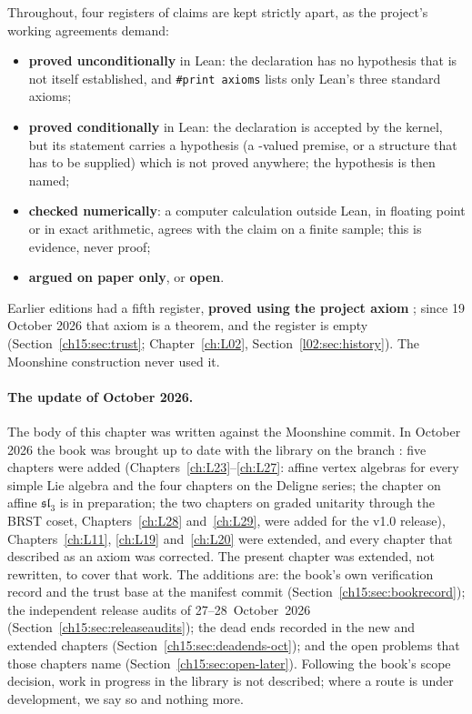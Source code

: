 Throughout, four registers of claims are kept strictly apart, as the project's working agreements
demand:
\begin{itemize}
\item \textbf{proved unconditionally} in Lean: the declaration has no hypothesis that is not
  itself established, and \texttt{\#print axioms} lists only Lean's three standard axioms;
\item \textbf{proved conditionally} in Lean: the declaration is accepted by the kernel, but its
  statement carries a hypothesis (a -valued premise, or a structure that has to be
  supplied) which is not proved anywhere; the hypothesis is then named;
\item \textbf{checked numerically}: a computer calculation outside Lean, in floating point or in
  exact arithmetic, agrees with the claim on a finite sample; this is evidence, never proof;
\item \textbf{argued on paper only}, or \textbf{open}.
\end{itemize}
Earlier editions had a fifth register, \textbf{proved using the project axiom}
; since 19 October 2026 that axiom is a theorem, and the register is empty
(Section~\ref{ch15:sec:trust}; Chapter~\ref{ch:L02}, Section~\ref{l02:sec:history}).
The Moonshine construction never used it.

\paragraph{The update of October 2026.} The body of this chapter was written against the Moonshine commit. In October 2026
the book was brought up to date with the library on the branch : five chapters were added
(Chapters~\ref{ch:L23}--\ref{ch:L27}: affine vertex algebras for every simple Lie algebra and the four chapters on the
Deligne series; the chapter on affine $\mathfrak{sl}_3$ is in preparation; the two chapters on graded unitarity through the
BRST coset, Chapters~\ref{ch:L28} and~\ref{ch:L29}, were added for the v1.0 release), Chapters~\ref{ch:L11}, \ref{ch:L19}
and~\ref{ch:L20} were extended, and every chapter that described  as an axiom was corrected. The present
chapter was extended, not rewritten, to cover that work. The additions are: the book's own verification record and the
trust base at the manifest commit (Section~\ref{ch15:sec:bookrecord}); the independent release audits of
27--28~October~2026 (Section~\ref{ch15:sec:releaseaudits}); the dead ends recorded in the new and extended chapters
(Section~\ref{ch15:sec:deadends-oct}); and the open problems that those chapters name
(Section~\ref{ch15:sec:open-later}). Following the book's scope decision, work in progress in the library is not
described; where a route is under development, we say so and nothing more.

